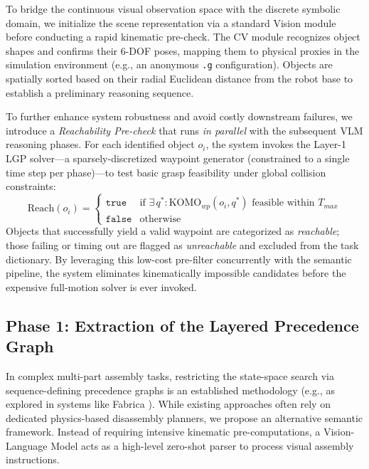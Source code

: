 \documentclass[journal]{IEEEtran}
\begin{document}
  To bridge the continuous visual observation space with the discrete symbolic domain,
  we initialize the scene representation via a standard Vision module before conducting a rapid kinematic pre-check.
  The CV module recognizes object shapes and confirms their 6-DOF poses, mapping
  them to physical proxies in the simulation environment (e.g., an anonymous
  \texttt{.g} configuration). Objects are spatially sorted based on their radial
  Euclidean distance from the robot base to establish a preliminary reasoning
  sequence.

  To further enhance system robustness and avoid costly downstream failures, we
  introduce a \textit{Reachability Pre-check} that runs \emph{in parallel} with
  the subsequent VLM reasoning phases. For each identified object $o_i$, the system
  invokes the Layer-1 LGP solver---a sparsely-discretized waypoint generator (constrained to a single time step per phase)---to test basic grasp feasibility under global
  collision constraints:
  \begin{equation}
    \text{Reach}(o_i) =
    \begin{cases}
      \texttt{true}  & \text{if } \exists\, q^* :
        \text{KOMO}_{wp}(o_i, q^*) \text{ feasible within } T_{max} \\
      \texttt{false} & \text{otherwise}
    \end{cases}
    \label{eq:reachability}
  \end{equation}
  Objects that successfully yield a valid waypoint are categorized as
  \textit{reachable}; those failing or timing out are flagged as
  \textit{unreachable} and excluded from the task dictionary. By leveraging this
  low-cost pre-filter concurrently with the semantic pipeline, the system
  eliminates kinematically impossible candidates before the expensive full-motion
  solver is ever invoked.

  \subsection{Phase 1: Extraction of the Layered Precedence Graph}
  \label{subsec:phase1}

  In complex multi-part assembly tasks, restricting the state-space search via
  sequence-defining precedence graphs is an established methodology (e.g., as
  explored in systems like Fabrica \cite{cite_arxiv_2506_05168}). While existing
  approaches often rely on dedicated physics-based disassembly planners, we propose
  an alternative semantic framework. Instead of requiring intensive kinematic
  pre-computations, a Vision-Language Model acts as a high-level zero-shot parser
  to process visual assembly instructions.
\end{document}

